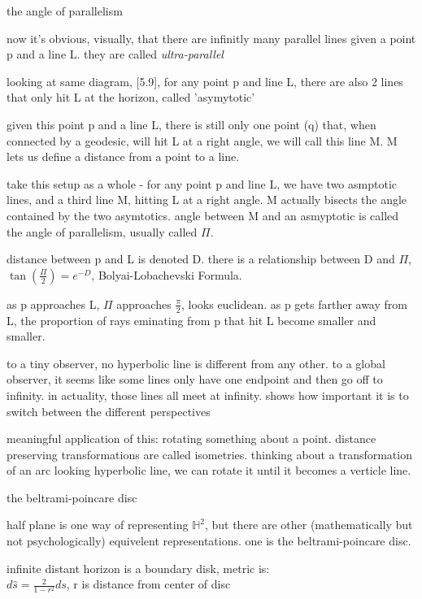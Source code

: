 \documentclass{article}
\newenvironment{andrew_section}[1]
    {
    \section{#1}
    \begin{itemize}
    }
    {
    \end{itemize}
    }
\begin{document}
\begin{andrew_section}{the angle of parallelism}
    \item 
        now it's obvious, visually, that there are infinitly many
        parallel lines given a point p and a line L.  they are called
        \emph{ultra-parallel}
    \item 
        looking at same diagram, [5.9], for any point p and 
        line L, there are also 2 lines that only hit L at the horizon,
        called 'asymytotic'
    \item 
        given this point p and a line L, there is still only one point (q)
        that, when connected by a geodesic, will hit L at a right angle, we
        will call this line M. M lets us define a distance from a point to a line.
    \item 
        take this setup as a whole - for any point p and line L, we have 
        two asmptotic lines, and a third line M, hitting L at a right angle.
        M actually bisects the angle contained by the two asymtotics.
        angle between M and an asmyptotic is called the angle of parallelism,
        usually called $\Pi$.  
    \item 
        distance between p and L is denoted D.  there is a relationship
        between D and $\Pi$, $\tan({\frac{\Pi}{2}}) = e^{-D}$, 
        Bolyai-Lobachevski Formula.
    \item 
        as p approaches L, $\Pi$ approaches $\frac{\pi}{2}$, looks euclidean.
        as p gets farther away from L, the proportion of rays eminating from p
        that hit L become smaller and smaller.
    \item 
        to a tiny observer, no hyperbolic line is different from any other.
        to a global observer, it seems like some lines only have one endpoint
        and then go off to infinity.  in actuality, those lines all meet at
        infinity.  shows how important it is to switch between the different
        perspectives
    \item 
        meaningful application of this: rotating something about a point.
        distance preserving transformations are called isometries.  thinking
        about a transformation of an arc looking hyperbolic line, we can rotate
        it until it becomes a verticle line.
\end{andrew_section}

\begin{andrew_section}{the beltrami-poincare disc}
    \item 
        half plane is one way of representing $\mathbb{H}^2$, but there
        are other (mathematically but not psychologically) equivelent
        representations.  one is the beltrami-poincare disc.
    \item 
        infinite distant horizon is a boundary disk, metric is: \\
        $d\hat{s} = \frac{2}{1 - r^2} ds$, r is distance from center of disc
\end{andrew_section}
\end{document}

